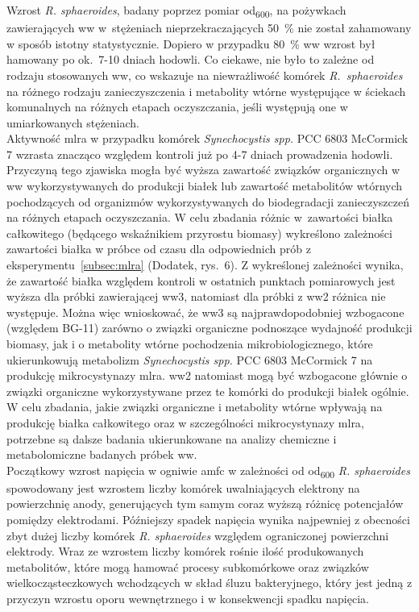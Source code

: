 Wzrost \textit{R. sphaeroides}, badany poprzez pomiar
\acrshort{od}\textsubscript{600}, na pożywkach zawierających
\acrshort{ww} w~stężeniach nieprzekraczających 50~\%
nie został zahamowany w sposób istotny statystycznie.
Dopiero w przypadku 80~\% \acrshort{ww} wzrost był hamowany
po ok.\ 7-10 dniach hodowli.
Co ciekawe, nie było to zależne od rodzaju stosowanych
\acrshort{ww}, co wskazuje na niewrażliwość komórek
\textit{R.~sphaeroides} na różnego rodzaju zanieczyszczenia
i metabolity wtórne występujące w ściekach komunalnych
na różnych etapach oczyszczania, jeśli występują one
w umiarkowanych stężeniach.\\

Aktywność \acrshort{mlra} w przypadku komórek
\textit{Synechocystis spp.} PCC 6803 McCormick 7
wzrasta znacząco względem kontroli już po 4-7 dniach
prowadzenia hodowli.
Przyczyną tego zjawiska mogła być wyższa zawartość
związków organicznych w \acrshort{ww} wykorzystywanych
do produkcji białek lub zawartość metabolitów
wtórnych pochodzących od organizmów wykorzystywanych
do biodegradacji zanieczyszczeń na różnych etapach oczyszczania.
W celu zbadania różnic w~zawartości białka całkowitego
(będącego wskaźnikiem przyrostu biomasy)
wykreślono zależności zawartości białka w próbce od czasu
dla odpowiednich prób z eksperymentu~\ref{subsec:mlra}
(Dodatek, rys.~6).
Z wykreślonej zależności wynika, że zawartość białka
względem kontroli w ostatnich punktach pomiarowych
jest wyższa dla próbki zawierającej \acrshort{ww}3, natomiast
dla próbki z \acrshort{ww}2 różnica nie występuje.
Można więc wnioskować, że \acrshort{ww}3 są najprawdopodobniej
wzbogacone (względem BG-11) zarówno o związki organiczne podnoszące
wydajność produkcji biomasy, jak i o metabolity wtórne
pochodzenia mikrobiologicznego, które ukierunkowują metabolizm
\textit{Synechocystis spp.} PCC 6803 McCormick 7 na produkcję
mikrocystynazy \acrshort{mlra}. \acrshort{ww}2 natomiast
mogą być wzbogacone głównie o związki organiczne wykorzystywane
przez te komórki do produkcji białek ogólnie.
W celu zbadania, jakie związki organiczne i metabolity
wtórne wpływają na produkcję białka całkowitego
oraz w szczególności mikrocystynazy \acrshort{mlra},
potrzebne są dalsze badania ukierunkowane na analizy
chemiczne i metabolomiczne badanych próbek \acrshort{ww}.\\

Początkowy wzrost napięcia w ogniwie \acrshort{amfc}
w zależności od \acrshort{od}\textsubscript{600}
\textit{R. sphaeroides} spowodowany jest wzrostem liczby
komórek uwalniających elektrony na powierzchnię anody,
generujących tym samym coraz wyższą różnicę potencjałów
pomiędzy elektrodami.
Późniejszy spadek napięcia wynika najpewniej z obecności
zbyt dużej liczby komórek \textit{R. sphaeroides}
względem ograniczonej powierzchni elektrody.
Wraz ze wzrostem liczby komórek rośnie ilość produkowanych
metabolitów, które mogą hamować procesy subkomórkowe oraz związków
wielkocząsteczkowych wchodzących w skład śluzu bakteryjnego,
który jest jedną z przyczyn wzrostu oporu wewnętrznego
i w konsekwencji spadku napięcia.